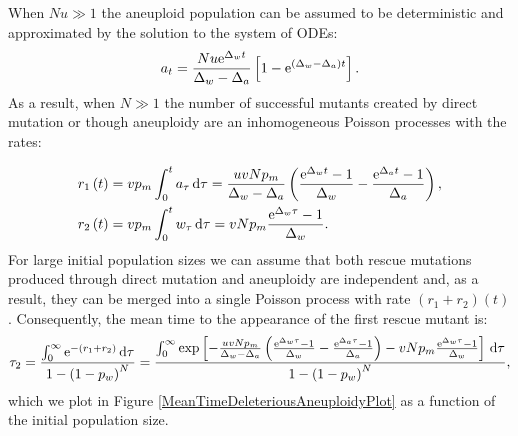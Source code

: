 \documentclass[12pt]{extarticle}
\renewcommand{\d}{{\rm d}}
\newcommand{\e}{{\rm e}}
\begin{document}
When $Nu\gg1$ the aneuploid population can be assumed to be deterministic and approximated by the solution to the system of ODEs:
\begin{equation}
a_t=\frac{Nu\e^{\Delta_wt}}{\Delta_w-\Delta_a}\left[1-\e^{\left(\Delta_w-\Delta_a\right)t}\right].
\end{equation}
As a result, when $N\gg1$ the number of successful mutants created by direct mutation or though aneuploidy are an inhomogeneous Poisson processes with the rates:


%

\begin{align*}
r_1\left(t\right)&=vp_m\int_0^ta_{\tau}\,\d\tau=\frac{uvNp_m}{\Delta_w-\Delta_a}\left(\frac{\e^{\Delta_wt}-1}{\Delta_w}-\frac{\e^{\Delta_at}-1}{\Delta_a}\right),\\
r_2\left(t\right)&=vp_m\int_0^tw_{\tau}\,\d\tau=vNp_m\frac{\e^{\Delta_w\tau}-1}{\Delta_w}.
\end{align*}
For large initial population sizes we can assume that both rescue mutations produced through direct mutation and aneuploidy are independent and, as a result, they can be merged into a single Poisson process with rate $\left(r_1+r_2\right)\left(t\right)$. Consequently, the mean time to the appearance of the first rescue mutant is: 
\begin{align}\label{meantimet2}
\tau_2=\frac{\int_0^\infty\e^{-\left(r_1+r_2\right)}\,\d\tau}{1-\left(1-p_w\right)^N}=\frac{\int_0^\infty\exp\left[-\frac{uvNp_m}{\Delta_w-\Delta_a}\left(\frac{\e^{\Delta_w\tau}-1}{\Delta_w}-\frac{\e^{\Delta_a\tau}-1}{\Delta_a}\right)-vNp_m\frac{\e^{\Delta_w\tau}-1}{\Delta_w}\right]\,\d\tau}{1-\left(1-p_w\right)^N},
\end{align}
which we plot in Figure \ref{MeanTimeDeleteriousAneuploidyPlot} as a function of the initial population size.
\end{document}
